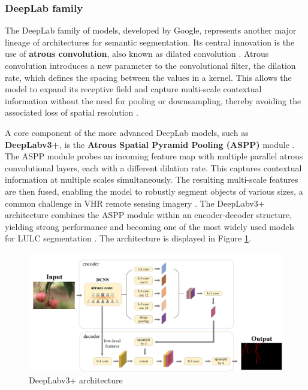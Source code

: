 \documentclass{report}
\begin{document}
\subsubsection*{DeepLab family}
The DeepLab family of models, developed by Google, represents another major lineage of architectures for semantic segmentation. Its central innovation is the use of \textbf{atrous convolution}, also known as dilated convolution \parencites[p.~4f.;]{YuanEtAlreviewdeeplearningmethodssemanticsegmentationremotesensingimagery2021}[p.~179.]{LuoEtAlSemanticsegmentationagriculturalimagessurvey2024}. Atrous convolution introduces a new parameter to the convolutional filter, the dilation rate, which defines the spacing between the values in a kernel. This allows the model to expand its receptive field and capture multi-scale contextual information without the need for pooling or downsampling, thereby avoiding the associated loss of spatial resolution \parencites[p.~5f.]{NeupaneEtAlDeepLearningBasedSemanticSegmentationUrbanFeaturesSatelliteImagesReviewMetaAnalysis2021}. \par
A core component of the more advanced DeepLab models, such as \textbf{DeepLabv3+}, is the \textbf{Atrous Spatial Pyramid Pooling (ASPP)} module \parencites[p.~8;]{SertelEtAlLandUseLandCoverMappingUsingDeepLearningBasedSegmentationApproachesVHRWorldview3Images2022}[p.~179]{LuoEtAlSemanticsegmentationagriculturalimagessurvey2024}. The ASPP module probes an incoming feature map with multiple parallel atrous convolutional layers, each with a different dilation rate. This captures contextual information at multiple scales simultaneously. The resulting multi-scale features are then fused, enabling the model to robustly segment objects of various sizes, a common challenge in VHR remote sensing imagery \parencites[p.~4f.]{YuanEtAlreviewdeeplearningmethodssemanticsegmentationremotesensingimagery2021}. The DeepLabv3+ architecture combines the ASPP module within an encoder-decoder structure, yielding strong performance and becoming one of the most widely used models for LULC segmentation \parencites[p.~179]{LuoEtAlSemanticsegmentationagriculturalimagessurvey2024}. The architecture is displayed in Figure \ref{fig:DeeplabV3+ architecture}.
\begin{figure}[H]
    \centering
    \includegraphics[width=1\linewidth]{Images_from_other_sources/DeeplabV3_architecture.png}
    \caption{DeepLabv3+ architecture \parencites[p.~180]{LuoEtAlSemanticsegmentationagriculturalimagessurvey2024}}
    \label{fig:DeeplabV3+ architecture}
\end{figure}
\end{document}
